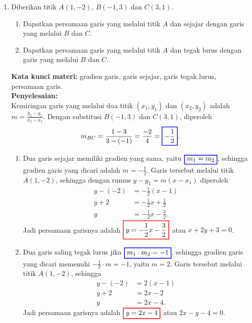 \documentclass[10pt,openany,a4paper]{article}
\theoremstyle{definition}
\theoremstyle{definition}
\theoremstyle{plain}
\newenvironment{jawab}[2][tes]{%
\par\noindent\textbf{Kata kunci materi:} #1.\\
\textbf{Penyelesaian:} #2%
}{}
\begin{document}
\begin{enumerate}
    \item Diberikan titik $A(1,-2)$, $B(-1,3)$ dan $C(3,1)$.
    \begin{enumerate}
        \item Dapatkan persamaan garis yang melalui titik $A$ dan sejajar dengan garis yang melalui $B$ dan $C$.
        \item Dapatkan persamaan garis yang melalui titik $A$ dan tegak lurus dengan garis yang melalui $B$ dan $C$.
    \end{enumerate}
    \begin{jawab}[gradien garis, garis sejajar, garis tegak lurus, persamaan garis]{~\\
        Kemiringan garis yang melalui dua titik $(x_1,y_1)$ dan $(x_2,y_2)$ adalah $m = \frac{y_2 - y_1}{x_2 - x_1}$. Dengan substitusi $B(-1,3)$ dan $C(3,1)$, diperoleh
        \begin{align*}
            m_{BC} = \frac{1-3}{3-(-1)} = \frac{-2}{4} = \colorlet{oldcolor}{.}
        \color{blue}
        \setlength{\fboxrule}{1pt} \boxed{\color{oldcolor}-\frac{1}{2}}\color{oldcolor}.
        \end{align*}
        \begin{enumerate}
            \item Dua garis sejajar memiliki gradien yang sama, yaitu $\colorlet{oldcolor}{.}
        \color{blue}
        \setlength{\fboxrule}{1pt} \boxed{\color{oldcolor}m_1=m_2}\color{oldcolor}$, sehingga gradien garis yang dicari adalah $m=-\frac{1}{2}$. Garis tersebut melalui titik $A(1,-2)$, sehingga dengan rumus $y - y_1 = m(x - x_1)$ diperoleh
            \begin{align*}
                y - (-2) &= -\frac{1}{2}(x - 1)\\
                y + 2 &= -\frac{1}{2}x + \frac{1}{2}\\
                y &= -\frac{1}{2}x - \frac{3}{2}.
            \end{align*}
            Jadi persamaan garisnya adalah $\colorlet{oldcolor}{.}
        \color{red}
        \setlength{\fboxrule}{1pt} \boxed{\color{oldcolor}y = -\frac{1}{2}x - \frac{3}{2}}\color{oldcolor}$ atau $x+2y+3=0$.
            \item Dua garis saling tegak lurus jika $\colorlet{oldcolor}{.}
        \color{blue}
        \setlength{\fboxrule}{1pt} \boxed{\color{oldcolor}m_1\cdot m_2=-1}\color{oldcolor}$, sehingga gradien garis yang dicari memenuhi $-\frac{1}{2}\cdot m=-1$, yaitu $m=2$. Garis tersebut melalui titik $A(1,-2)$, sehingga
            \begin{align*}
                y - (-2) &= 2(x - 1)\\
                y + 2 &= 2x - 2\\
                y &= 2x - 4.
            \end{align*}
            Jadi persamaan garisnya adalah $\colorlet{oldcolor}{.}
        \color{red}
        \setlength{\fboxrule}{1pt} \boxed{\color{oldcolor}y = 2x - 4}\color{oldcolor}$ atau $2x-y-4=0$.
        \end{enumerate}
    }
    \end{jawab}


\end{enumerate}
\end{document}
